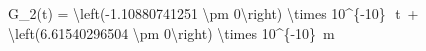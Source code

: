G_2(t) = \SI[parse-numbers = false]{\left(-1.10880741251 \pm 0\right) \times 10^{-10}}{}\, \cdot \,t\, + \SI[parse-numbers = false]{\left(6.61540296504 \pm 0\right) \times 10^{-10}}{\meter}